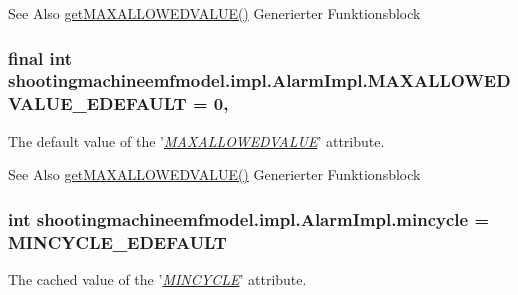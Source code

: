 \begin{DoxySeeAlso}{See Also}
\hyperlink{classshootingmachineemfmodel_1_1impl_1_1_alarm_impl_a4b4fd8f246341c47e1469cb78ac1fd7b}{get\-M\-A\-X\-A\-L\-L\-O\-W\-E\-D\-V\-A\-L\-U\-E()} Generierter Funktionsblock  
\end{DoxySeeAlso}
\hypertarget{classshootingmachineemfmodel_1_1impl_1_1_alarm_impl_af80742cf00da4bbdb1a55441e3e18835}{
\subsubsection[{M\-A\-X\-A\-L\-L\-O\-W\-E\-D\-V\-A\-L\-U\-E\-\_\-\-E\-D\-E\-F\-A\-U\-L\-T}]{\setlength{\rightskip}{0pt plus 5cm}final int shootingmachineemfmodel.\-impl.\-Alarm\-Impl.\-M\-A\-X\-A\-L\-L\-O\-W\-E\-D\-V\-A\-L\-U\-E\-\_\-\-E\-D\-E\-F\-A\-U\-L\-T = 0\hspace{0.3cm}{\ttfamily [static]}, {\ttfamily [protected]}}}\label{classshootingmachineemfmodel_1_1impl_1_1_alarm_impl_af80742cf00da4bbdb1a55441e3e18835}
The default value of the '\hyperlink{classshootingmachineemfmodel_1_1impl_1_1_alarm_impl_a4b4fd8f246341c47e1469cb78ac1fd7b}{{\itshape M\-A\-X\-A\-L\-L\-O\-W\-E\-D\-V\-A\-L\-U\-E}}' attribute.

\begin{DoxySeeAlso}{See Also}
\hyperlink{classshootingmachineemfmodel_1_1impl_1_1_alarm_impl_a4b4fd8f246341c47e1469cb78ac1fd7b}{get\-M\-A\-X\-A\-L\-L\-O\-W\-E\-D\-V\-A\-L\-U\-E()} Generierter Funktionsblock  
\end{DoxySeeAlso}
\hypertarget{classshootingmachineemfmodel_1_1impl_1_1_alarm_impl_ae26a6934576aacef8b9aae1e6c6a3010}{
\subsubsection[{mincycle}]{\setlength{\rightskip}{0pt plus 5cm}int shootingmachineemfmodel.\-impl.\-Alarm\-Impl.\-mincycle = {\bf M\-I\-N\-C\-Y\-C\-L\-E\-\_\-\-E\-D\-E\-F\-A\-U\-L\-T}\hspace{0.3cm}{\ttfamily [protected]}}}\label{classshootingmachineemfmodel_1_1impl_1_1_alarm_impl_ae26a6934576aacef8b9aae1e6c6a3010}
The cached value of the '\hyperlink{classshootingmachineemfmodel_1_1impl_1_1_alarm_impl_aac505ee5c09efc58d74135ed3c549009}{{\itshape M\-I\-N\-C\-Y\-C\-L\-E}}' attribute.


